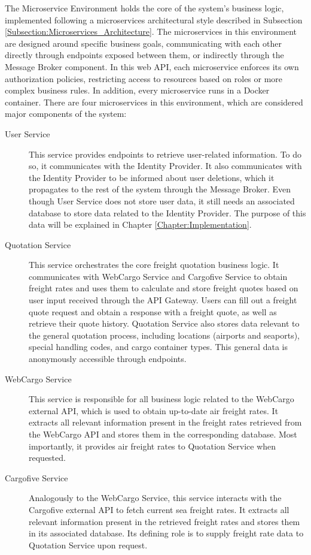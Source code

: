 \documentclass[12pt, reqno, oneside]{amsbook}
\theoremstyle{definition}
\theoremstyle{definition}
\numberwithin{section}{chapter}
\numberwithin{table}{chapter}
\numberwithin{figure}{chapter}
\begin{document}
The Microservice Environment holds the core of the system's business logic, implemented following a microservices architectural style described in Subsection \ref{Subsection:Microservices_Architecture}. The microservices in this environment are designed around specific business goals, communicating with each other directly through endpoints exposed between them, or indirectly through the Message Broker component. In this web \ac{API}, each microservice enforces its own authorization policies, restricting access to resources based on roles or more complex business rules. In addition, every microservice runs in a Docker container.
There are four microservices in this environment, which are considered major components of the system:
\begin{description}
  \item[User Service] This service provides endpoints to retrieve user-related information. To do so, it communicates with the Identity Provider. It also communicates with the Identity Provider to be informed about user deletions, which it propagates to the rest of the system through the Message Broker. Even though User Service does not store user data, it still needs an associated database to store data related to the Identity Provider. The purpose of this data will be explained in Chapter \ref{Chapter:Implementation}.
  \item[Quotation Service] This service orchestrates the core freight quotation business logic. It communicates with WebCargo Service and Cargofive Service to obtain freight rates and uses them to calculate and store freight quotes based on user input received through the \ac{API} Gateway. Users can fill out a freight quote request and obtain a response with a freight quote, as well as retrieve their quote history. Quotation Service also stores data relevant to the general quotation process, including locations (airports and seaports), special handling codes, and cargo container types. This general data is anonymously accessible through endpoints.
  \item[WebCargo Service] This service is responsible for all business logic related to the WebCargo external \ac{API}, which is used to obtain up-to-date air freight rates. It extracts all relevant information present in the freight rates retrieved from the WebCargo \ac{API} and stores them in the corresponding database. Most importantly, it provides air freight rates to Quotation Service when requested.
  \item[Cargofive Service] Analogously to the WebCargo Service, this service interacts with the Cargofive external \ac{API} to fetch current sea freight rates. It extracts all relevant information present in the retrieved freight rates and stores them in its associated database. Its defining role is to supply freight rate data to Quotation Service upon request.
\end{description}
\end{document}
